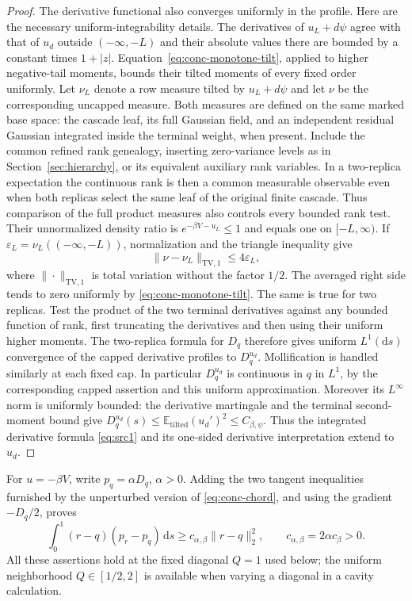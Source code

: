 \documentclass[11pt,a4paper]{article}
\numberwithin{equation}{section}
\theoremstyle{definition}
\theoremstyle{remark}
\newcommand{\E}{\mathbb E}
\newcommand{\dd}{\mathrm d}
\begin{document}
\begin{proof}
The derivative functional also converges uniformly in the profile.  Here
are the necessary uniform-integrability details.  The derivatives of
$u_L+d\psi$ agree with that of $u_d$ outside $(-\infty,-L)$ and their
absolute values there are bounded by a constant times $1+|z|$.
Equation~\eqref{eq:conc-monotone-tilt}, applied to higher negative-tail
moments, bounds their tilted moments of every fixed order uniformly.
Let $\nu_L$ denote a row measure tilted by $u_L+d\psi$ and let $\nu$
be the corresponding uncapped measure.  Both measures are defined on the
same marked base space: the cascade leaf, its full Gaussian field, and an
independent residual Gaussian integrated inside the terminal weight, when
present.  Include the common refined rank genealogy, inserting zero-variance
levels as in Section~\ref{sec:hierarchy}, or its equivalent auxiliary rank
variables.  In a two-replica expectation the continuous rank is then a
common measurable observable even when both replicas select the same
leaf of the original finite cascade.  Thus comparison of the full product
measures also controls every bounded rank test.
Their unnormalized density ratio
is $e^{-\beta V-u_L}\leq1$ and equals one on $[-L,\infty)$.
If $\varepsilon_L=\nu_L(( -\infty,-L))$, normalization and the triangle
inequality give
\[
 \|\nu-\nu_L\|_{\mathrm{TV},1}\leq4\varepsilon_L,
\]
where $\|\cdot\|_{\mathrm{TV},1}$ is total variation without the factor
$1/2$.  The averaged right side tends to zero uniformly by
\eqref{eq:conc-monotone-tilt}.  The same is true for two replicas.
Test the product of the two terminal derivatives against any bounded
function of rank, first truncating the derivatives and then using their
uniform higher moments.  The two-replica formula for $D_q$ therefore gives
uniform $L^1(\dd s)$ convergence of the capped derivative profiles to
$D^{u_d}_q$.  Mollification is handled similarly at each
fixed cap.  In particular $D^{u_d}_q$ is continuous in $q$ in $L^1$, by the
corresponding capped assertion and this uniform approximation.
Moreover its $L^\infty$ norm is uniformly bounded: the derivative martingale
and the terminal second-moment bound give
$D^{u_d}_q(s)\leq\E_{\mathrm{tilted}}(u_d')^2\leq C_{\beta,\psi}$.
Thus the integrated derivative formula \eqref{eq:src1} and its one-sided
derivative interpretation extend to $u_d$.
\end{proof}

For $u=-\beta V$, write $p_q=\alpha D_q$, $\alpha>0$.
Adding the two tangent inequalities furnished by
the unperturbed version of \eqref{eq:conc-chord}, and using the gradient
$-D_q/2$, proves
\begin{equation}
 \int_0^1(r-q)(p_r-p_q)\,\dd s
       \geq c_{\alpha,\beta}\|r-q\|_2^2,
 \qquad c_{\alpha,\beta}=2\alpha c_\beta>0.
 \label{eq:src6}
\end{equation}
All these assertions hold at the fixed diagonal $Q=1$ used below; the
uniform neighborhood $Q\in[1/2,2]$ is available when varying a diagonal
in a cavity calculation.
\end{document}
